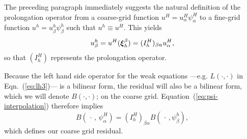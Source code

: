 
The preceding paragraph immediately suggests the natural definition of the prolongation operator from a coarse-grid function $u^{H}\!=\!u^{H}_\alpha\psi_\alpha^{H}$ to a fine-grid
  function $u^{h}\!=\!u^{h}_\beta\psi_\beta^{h}$ such that $u^{h}\equiv u^{H}$.   This yields
  \begin{equation}
    u^{h}_\beta= u^{H}(\boldsymbol{\xi}^\beta_h)    = (I_{h}^{H})_{\beta\alpha} u^{H}_\alpha,
    \end{equation}so that $(I_{h}^{H})$ represents the prolongation operator.

Because the left hand side operator for the weak equations ---e.g. $L(\cdot,\cdot)$ in Eqn.~(\ref{eq:lh3})--- is a bilinear form, the residual will also be a bilinear form, which we will denote $B(\cdot,\cdot)$; on the coarse grid.  Equation~(\ref{eq:psi-interpolation}) therefore implies
  \begin{equation}\label{eq:temp-G}
    B(\,\cdot\,, \,\psi_\alpha^{H})=(I_{h}^{H})_{\beta\alpha}B(\,\cdot\,,\psi_\beta^{h}),
  \end{equation}
  which defines our coarse grid residual.

